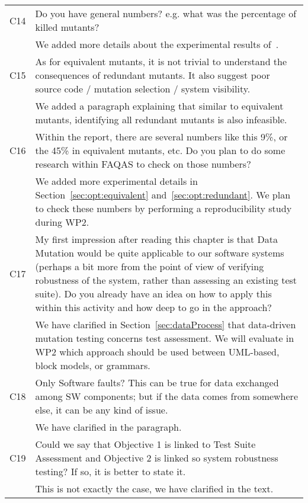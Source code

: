 \begin{longtable}{|p{1.2cm}|p{12cm}|@{}}
\begin{minipage}{10cm}
\end{minipage}
\\
\hline
C14&
Do you have general numbers? e.g. what was the percentage of killed mutants?
\\
\cmidrule{2-2}
&
We added more details about the experimental results of~\cite{schuler2013covering}.
\\
\hline
C15&
As for equivalent mutants, it is not trivial to understand the consequences of redundant mutants. It also suggest poor source code / mutation selection /
system visibility.
\\
\cmidrule{2-2}
&
We added a paragraph explaining that similar to equivalent mutants, identifying all redundant mutants is also infeasible.
\\
\hline
C16&
Within the report, there are several numbers like this 9\%, or the 45\% in equivalent mutants, etc. Do you plan to do some research within FAQAS to check
on those numbers?
\\
\cmidrule{2-2}
&
We added more experimental details in Section~\ref{sec:opt:equivalent} and~\ref{sec:opt:redundant}. We plan to check these numbers by performing a reproducibility study during WP2.
\\

\hline
C17&
My first impression after reading this chapter is that Data Mutation would be quite applicable to our software systems (perhaps a bit more from the point of
view of verifying robustness of the system, rather than assessing an existing test suite).
Do you already have an idea on how to apply this within this activity and how deep to go in the approach?
\\
\cmidrule{2-2}
&
We have clarified in Section~\ref{sec:dataProcess} that data-driven mutation testing concerns test assessment. We will evaluate in WP2 which approach should be used between UML-based, block models, or grammars.

\\

\hline
C18&
Only Software faults? This can be true for data exchanged among SW components; but if the data comes from somewhere else, it can be any kind of
issue.
\\
\cmidrule{2-2}
&We have clarified in the paragraph.
\\
\hline
C19&
Could we say that Objective 1 is linked to Test Suite Assessment and Objective 2 is linked so system robustness testing? If so, it is better to state it.
\\
\cmidrule{2-2}
&This is not exactly the case, we have clarified in the text.
\\


\end{longtable}
